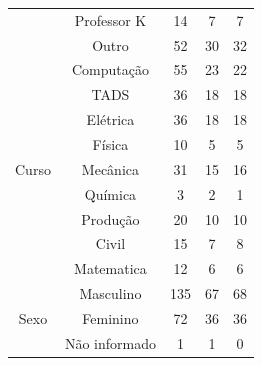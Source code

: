 \begin{table}[h]
\begin{tabular}{|c|c|c|c|c|}
                                        & Professor K      & 14                                  & 7                    & 7                                \\
                                        & Outro            & 52                                  & 30                   & 32                               \\ \hline
  \multirow{9}{*}{Curso}                & Computação       & 55                                  & 23                   & 22                               \\
                                        & TADS             & 36                                  & 18                   & 18                               \\
                                        & Elétrica         & 36                                  & 18                   & 18                               \\
                                        & Física           & 10                                  & 5                    & 5                                \\
                                        & Mecânica         & 31                                  & 15                   & 16                               \\
                                        & Química          & 3                                   & 2                    & 1                                \\
                                        & Produção         & 20                                  & 10                   & 10                               \\
                                        & Civil            & 15                                  & 7                    & 8                                \\
                                        & Matematica       & 12                                  & 6                    & 6                                \\ \hline
  \multirow{3}{*}{Sexo}                 & Masculino        & 135                                 & 67                   & 68                               \\
                                        & Feminino         & 72                                  & 36                   & 36                               \\
                                        & Não informado    & 1                                   & 1                    & 0                                \\ \hline

\end{tabular}
\end{table}
